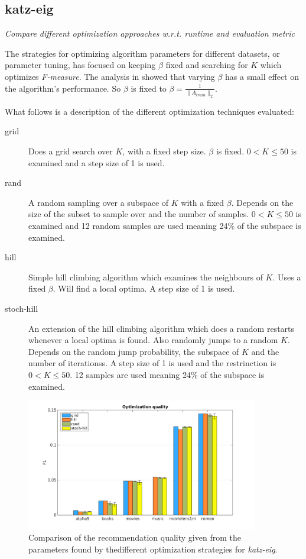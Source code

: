 
\subsection{katz-eig}

\textit{Compare different optimization approaches w.r.t. runtime and evaluation metric}

The strategies for optimizing algorithm parameters for different datasets, or parameter tuning, has focused on keeping $\beta$ fixed and searching for $K$ which optimizes \textit{F-measure}. The analysis in  showed that varying $\beta$ has a small effect on the algorithm's performance. So $\beta$ is fixed to $\beta = \frac{1}{\|A_{train}\|_2}$.

What follows is a description of the different optimization techniques evaluated:

\begin{description}
    \item[grid]
        Does a grid search over $K$, with a fixed step size. $\beta$ is fixed. $0 < K \leq 50$ is examined and a step size of 1 is used.
    \item[rand]
        A random sampling over a subspace of $K$ with a fixed $\beta$. Depends on the size of the subset to sample over and the number of samples. $0 < K \leq 50$ is examined and 12 random samples are used meaning 24\% of the subspace is examined.
    \item[hill]
        Simple hill climbing algorithm which examines the neighbours of $K$. Uses a fixed $\beta$. Will find a local optima. A step size of 1 is used.
    \item[stoch-hill]
        An extension of the hill climbing algorithm which does a random restarts whenever a local optima is found. Also randomly jumps to a random $K$. Depends on the random jump probability, the subspace of $K$ and the number of iterationss. A step size of 1 is used and the restrinction is $0 < K \leq 50$. 12 samples are used meaning 24\% of the subspace is examined.
\end{description}

\begin{figure}[h!]
    \centering
    \includegraphics[width=0.9\textwidth]{fig/comp/comp_katz_quality.png}
    \caption{Comparison of the recommendation quality given from the parameters found by thedifferent optimization strategies for \textit{katz-eig}.}
\end{figure}

